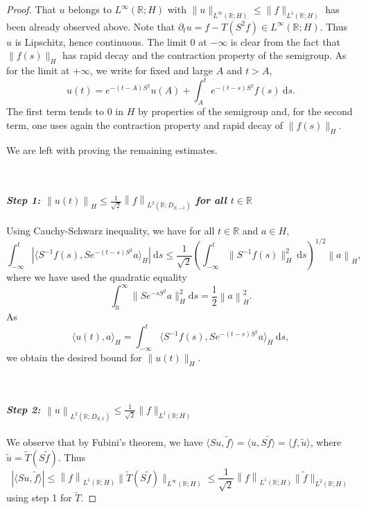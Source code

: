 \documentclass[10pt,a4paper]{amsart}
\begin{document}
\begin{proof} That $u$ belongs to $L^\infty(\mathbb{R};H)$ with $\| u\|_{L^\infty(\mathbb{R};H)} \le \|f\|_{L^1(\mathbb{R};H)}$ has been already observed above. Note that $\partial_t u= f-T(S^2f)\in  L^\infty(\mathbb{R};H)$. Thus $u$ is Lipschitz, hence continuous. The limit 0 at $-\infty$ is clear from the fact that $\|f(s)\|_H$ has rapid decay and the contraction property of the semigroup.  As for the limit at $+\infty$, we write for fixed and large $A$ and $t>A$, 
$$ u(t)= e^{-(t-A)S^2}u(A)+ \int_A^t e^{-(t-s)S^2}f(s) \ \mathrm{d}s. $$
The first term tends to 0 in $H$ by properties of the semigroup and, for the second term, one uses again the contraction property and  rapid decay of $\|f(s)\|_H$. 

We are left with proving the remaining estimates. 

\

\paragraph{\textit{Step 1:  $\left\| u(t)\right\|_H \leq \frac{1}{\sqrt{2}} \left\|f \right\|_{L^2(\mathbb{R}; D_{S,-1})}$ for all $t \in \mathbb{R}$}}
Using Cauchy-Schwarz inequality, we have for all $t \in \mathbb{R}$ and $a \in H$, 
\begin{equation*}
    \int_{-\infty}^{t} | \langle  S^{-1}f(s) ,Se^{-(t-s)S^2} a \rangle_H | \ \mathrm d s \leq \frac{1}{\sqrt{2}}\left ( \int_{-\infty}^{t} \|S^{-1}f(s) \|^2_H \ \mathrm{d}s \right )^{1/2} \left\| a\right\|_H,
\end{equation*}
where we have used the quadratic equality 
\begin{equation*}
    \int_{0}^{\infty} \|Se^{-sS^2}a \|^2_H \mathrm d s =\frac{1}{2}\left\| a\right\|_H^2.
\end{equation*}
As 
\begin{equation*}
    \langle  u(t) , a \rangle_H = \int_{-\infty}^{t} \langle  S^{-1}f(s) , Se^{-(t-s)S^2}a \rangle_H \ \mathrm d s, 
\end{equation*}
we obtain the desired bound for $\|u(t)\|_H$.

\

\paragraph{\textit{Step 2:  $\left\|u \right\|_{L^2(\mathbb{R}; D_{S,1})} \le \frac{1}{\sqrt{2}} \|f\|_{L^1(\mathbb{R};H)}$}}
We observe that by Fubini's theorem, we have $\langle Su, \tilde f\rangle=  \langle u, S\tilde f\rangle=\langle f, \tilde u\rangle$, where $\tilde u=\tilde T(S\tilde f)$. Thus
\begin{equation*}
    |\langle Su, \tilde f\rangle| 
    \le  
    \left \| f  \right \|_{L^1(\mathbb{R};H)}  \| \tilde T(S\tilde f)   \|_{L^\infty(\mathbb{R};H)}
    \le 
    \frac{1}{\sqrt{2}} \left \| f  \right \|_{L^1(\mathbb{R};H)}  \| \tilde f   \|_{L^2(\mathbb{R};H)}
\end{equation*}
using step 1 for $\tilde T$. 


\end{proof}
\end{document}
